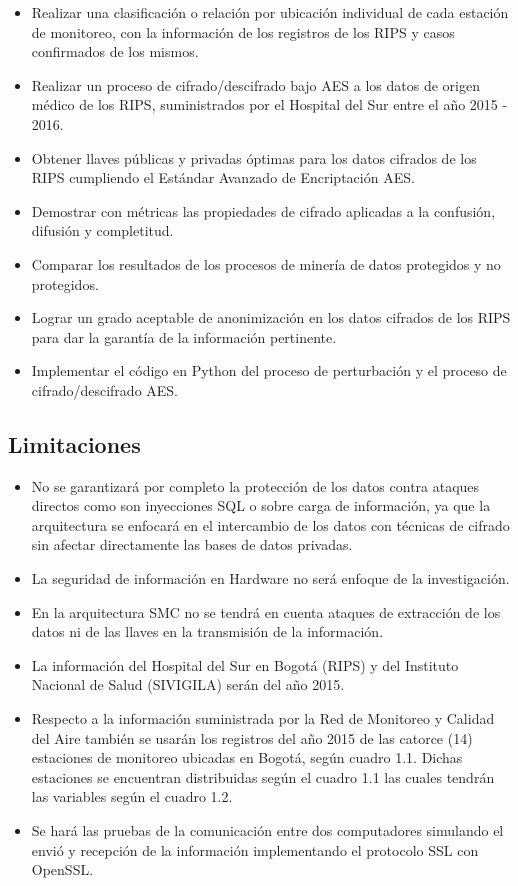 \documentclass[a4paper,openright,12pt]{book}
\theoremstyle{definition}
\theoremstyle{remark}
\begin{document}
\begin{itemize}
\item Realizar una clasificación o relación por ubicación individual de cada estación de monitoreo, con la información de los registros de los RIPS y casos confirmados de los mismos.
\item Realizar un proceso de cifrado/descifrado bajo AES a los datos de origen médico de los RIPS, suministrados por el Hospital del Sur entre el año 2015 - 2016.
\item Obtener llaves públicas y privadas óptimas para los datos cifrados de los RIPS cumpliendo el Estándar Avanzado de Encriptación AES.
\item Demostrar con métricas las propiedades de cifrado aplicadas a la confusión, difusión y completitud.
\item Comparar los resultados de los procesos de minería de datos protegidos y no protegidos.
\item Lograr un grado aceptable de anonimización en los datos cifrados de los RIPS para dar la garantía de la información pertinente.
\item Implementar  el código en Python del proceso de perturbación y el proceso de cifrado/descifrado AES.
\end{itemize}

\subsection{Limitaciones}

\begin{itemize}
\item No se garantizará por completo la protección de los datos contra ataques directos como son inyecciones SQL o sobre carga de información, ya que la arquitectura se enfocará en el intercambio de los datos con técnicas de cifrado sin afectar directamente las bases de datos privadas. 
\item La seguridad de información en Hardware no será enfoque de la investigación.
\item En la arquitectura SMC no se tendrá en cuenta ataques de extracción de los datos ni de las llaves en la transmisión de la información.
\item La información del Hospital del Sur en Bogotá (RIPS) y del Instituto Nacional de Salud (SIVIGILA) serán del año 2015.
\item Respecto a la información suministrada por la Red de Monitoreo y Calidad del Aire también se usarán los registros del año 2015 de las catorce (14) estaciones de monitoreo ubicadas en Bogotá, según cuadro 1.1. Dichas estaciones se encuentran distribuidas según el cuadro 1.1 las cuales tendrán las variables según el cuadro 1.2.
\item Se hará las pruebas de la comunicación entre dos computadores simulando el envió y recepción de la información implementando el protocolo SSL con OpenSSL.
\end{itemize}
\end{document}
